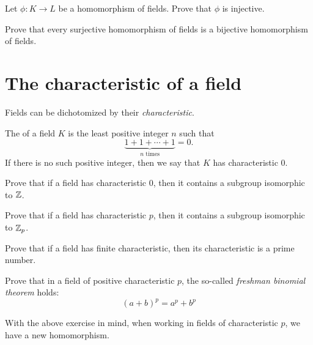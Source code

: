 \documentclass{ximera}
\begin{document}
\begin{exercise}
  Let $\phi:K\to L$ be a homomorphism of fields. Prove that $\phi$ is
  injective.
\end{exercise}

\begin{exercise}
  Prove that every surjective homomorphism of fields is a bijective
  homomorphism of fields.
\end{exercise}







\section{The characteristic of a field}


Fields can be dichotomized by their \textit{characteristic}.

\begin{definition}
The  of a field $K$ is the least positive
integer $n$ such that
\[
\underbrace{1 + 1 + \cdots +1}_{\text{$n$ times}} =0.
\]
If there is no such positive integer, then we say that $K$ has
characteristic $0$.
\end{definition}


\begin{exercise}
  Prove that if a field has characteristic $0$, then it contains a
  subgroup isomorphic to $\mathbb Z$.
\end{exercise}

\begin{exercise}
  Prove that if a field has characteristic $p$, then it contains a
  subgroup isomorphic to $\mathbb Z_p$.
\end{exercise}



\begin{exercise}\label{E:fcp}
Prove that if a field has finite characteristic, then its
characteristic is a prime number.
\end{exercise}

\begin{exercise}\label{E:FBT}
Prove that in a field of positive characteristic $p$, the so-called
\textit{freshman binomial theorem} holds:
\[
(a+b)^p = a^p + b^p
\]
\end{exercise}



With the above exercise in mind, when working in fields of
characteristic $p$, we have a new homomorphism.
\end{document}
